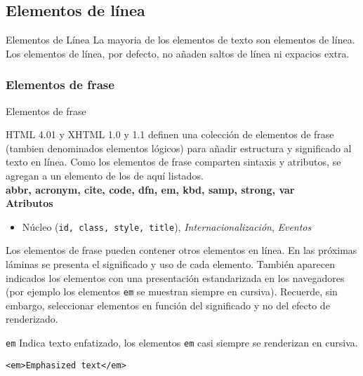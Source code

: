 
\subsection{Elementos de línea} %

\begin{frame}{Elementos de Línea} %
    La mayoria de los elementos de texto son elementos de línea. Los elementos
    de línea, por defecto, no añaden saltos de línea ni expacios extra. 
\end{frame}

\subsubsection{Elementos de frase}

\begin{frame}{Elementos de frase} %

\footnotesize{
    HTML 4.01 y XHTML 1.0 y 1.1 definen una colección de elementos de frase
    (tambien denominados elementos lógicos) para añadir estructura y
    significado al texto en línea. Como los elementos de frase comparten
    sintaxis y atributos, se agregan a un elemento de los de aquí listados.\\[0.5cm]

    \textbf{abbr, acronym, cite, code, dfn, em, kbd, samp, strong, var}\\[0.5cm]

    \textbf{Atributos}
    \begin{itemize}
        \item Núcleo (\texttt{id, class, style, title}),
        \textit{Internacionalización},  \textit{Eventos}
    \end{itemize}

    Los elementos de frase pueden contener otros elementos en línea. En las
    próximas láminas se presenta el significado y uso de cada elemento. También
    aparecen indicados los elementos con una presentación estandarizada en los
    navegadores (por ejemplo los elementos \texttt{em} se muestran siempre en
    cursiva). Recuerde, sin embargo, seleccionar elementos en función del
    significado y no del efecto de renderizado. 
}
\end{frame}

\begin{frame}[fragile]{\texttt{em}} %
    Indica texto enfatizado, los elementos \texttt{em} casi siempre se
    renderizan en cursiva. 
    \begin{lstlisting}
<em>Emphasized text</em>
    \end{lstlisting}
\end{frame}

